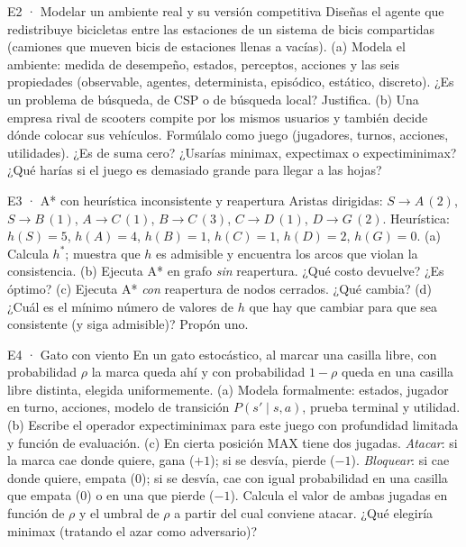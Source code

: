 \begin{ejercicio}{E2 · Modelar un ambiente real y su versión competitiva }
Diseñas el agente que redistribuye bicicletas entre las estaciones de un sistema de bicis compartidas
(camiones que mueven bicis de estaciones llenas a vacías).
(a) Modela el ambiente: medida de desempeño, estados, perceptos, acciones y las seis propiedades
(observable, agentes, determinista, episódico, estático, discreto). ¿Es un problema de búsqueda, de
CSP o de búsqueda local? Justifica.
(b) Una empresa rival de scooters compite por los mismos usuarios y también decide dónde colocar sus
vehículos. Formúlalo como juego (jugadores, turnos, acciones, utilidades). ¿Es de suma cero? ¿Usarías
minimax, expectimax o expectiminimax? ¿Qué harías si el juego es demasiado grande para llegar a las hojas?
\end{ejercicio}

\begin{ejercicio}{E3 · A* con heurística inconsistente y reapertura }
Aristas dirigidas: $S\to A\,(2)$, $S\to B\,(1)$, $A\to C\,(1)$, $B\to C\,(3)$, $C\to D\,(1)$, $D\to G\,(2)$.
Heurística: $h(S)=5$, $h(A)=4$, $h(B)=1$, $h(C)=1$, $h(D)=2$, $h(G)=0$.
(a) Calcula $h^*$; muestra que $h$ es admisible y encuentra los arcos que violan la consistencia.
(b) Ejecuta A* en grafo \emph{sin} reapertura. ¿Qué costo devuelve? ¿Es óptimo?
(c) Ejecuta A* \emph{con} reapertura de nodos cerrados. ¿Qué cambia?
(d) ¿Cuál es el mínimo número de valores de $h$ que hay que cambiar para que sea consistente (y siga admisible)? Propón uno.
\end{ejercicio}

\begin{ejercicio}{E4 · Gato con viento }
En un gato estocástico, al marcar una casilla libre, con probabilidad $\rho$ la marca queda ahí y con
probabilidad $1-\rho$ queda en una casilla libre distinta, elegida uniformemente.
(a) Modela formalmente: estados, jugador en turno, acciones, modelo de transición $P(s'\mid s,a)$,
prueba terminal y utilidad.
(b) Escribe el operador expectiminimax para este juego con profundidad limitada y función de evaluación.
(c) En cierta posición MAX tiene dos jugadas. \emph{Atacar}: si la marca cae donde quiere, gana ($+1$);
si se desvía, pierde ($-1$). \emph{Bloquear}: si cae donde quiere, empata ($0$); si se desvía, cae con igual
probabilidad en una casilla que empata ($0$) o en una que pierde ($-1$). Calcula el valor de ambas jugadas
en función de $\rho$ y el umbral de $\rho$ a partir del cual conviene atacar. ¿Qué elegiría minimax (tratando
el azar como adversario)?
\end{ejercicio}

